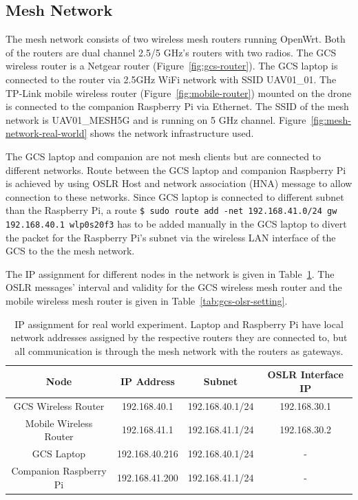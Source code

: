 \subsection{Mesh Network}

The mesh network consists of two wireless mesh routers running OpenWrt. Both of the routers are dual channel 2.5/5 GHz's routers with two radios. The GCS wireless router is a Netgear router (Figure~\ref{fig:gcs-router}). The GCS laptop is connected to the router via 2.5GHz WiFi network with SSID UAV01\_01. The TP-Link mobile wireless router (Figure~\ref{fig:mobile-router}) mounted on the drone is connected to the companion Raspberry Pi via Ethernet. The SSID of the mesh network is UAV01\_MESH5G and is running on 5 GHz channel. Figure~\ref{fig:mesh-network-real-world} shows the network infrastructure used.

The GCS laptop and companion are not mesh clients but are connected to different networks. Route between the GCS laptop and companion Raspberry Pi is achieved by using OSLR Host and network association (HNA) message to allow connection to these networks. Since GCS laptop is connected to different subnet than the Raspberry Pi, a route \texttt{\$ sudo route add -net 192.168.41.0/24 gw 192.168.40.1 wlp0s20f3} has to be added manually in the GCS laptop to divert the packet for the Raspberry Pi's subnet via the wireless LAN interface of the GCS to the the mesh network.

The IP assignment for different nodes in the network is given in Table~\ref{tab:network-assignment}. The OSLR messages' interval and validity for the GCS wireless mesh router and the mobile wireless mesh router is given in Table~\ref{tab:gcs-olsr-setting}.


\begin{table}[t]
	\caption[IP assignment for real world experiment.]{\small IP assignment for real world experiment. Laptop and Raspberry Pi have local network addresses assigned by the respective routers they are connected to, but all communication is through the mesh network with the routers as gateways.}
	\begin{center}
		\begin{tabular}{c|c|c|c}
			\hline Node & IP Address & Subnet & OSLR Interface IP\\ \hline \hline
			GCS Wireless Router & 192.168.40.1 &  192.168.40.1/24 & 192.168.30.1 \\ \hline
			Mobile Wireless Router & 192.168.41.1 & 192.168.41.1/24 & 192.168.30.2   \\ \hline 
			GCS Laptop & 192.168.40.216 & 192.168.40.1/24 & -  \\ \hline 
			Companion Raspberry Pi & 192.168.41.200 & 192.168.41.1/24 & - \\ \hline
		\end{tabular}
	\end{center}
	\label{tab:network-assignment}
\end{table} 


